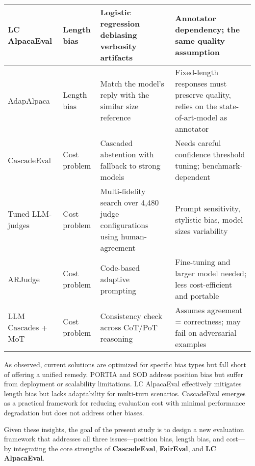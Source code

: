\documentclass[sigconf, authoryear]{acmart}
\begin{document}
\begin{table}[H]
{\begin{tabular}{|p{2.6cm}|p{1.6cm}|p{3.0cm}|p{4.2cm}|}
            \hline
            LC AlpacaEval      & Length bias                      & Logistic regression debiasing verbosity artifacts                           & Annotator dependency; the same quality assumption                                           \\
            \hline
            AdapAlpaca         & Length bias                      & Match the model's reply with the similar size reference                     & Fixed-length responses must preserve quality, relies on the state-of-art-model as annotator \\
            \hline
            CascadeEval        & Cost problem                     & Cascaded abstention with fallback to strong models                          & Needs careful confidence threshold tuning; benchmark-dependent                              \\
            \hline
            Tuned LLM-judges   & Cost problem                     & Multi-fidelity search over 4,480 judge configurations using human-agreement & Prompt sensitivity, stylistic bias, model sizes variability                                 \\
            \hline
            ARJudge            & Cost problem                     & Code-based adaptive prompting                                               & Fine-tuning and larger model needed; less cost-efficient and portable                       \\
            \hline
            LLM Cascades + MoT & Cost problem                     & Consistency check across CoT/PoT reasoning                                  & Assumes agreement = correctness; may fail on adversarial examples                           \\
            \hline
        \end{tabular}%
    }
\end{table}

As observed, current solutions are optimized for specific bias types but fall short of offering a unified remedy.
PORTIA and SOD address position bias but suffer from deployment or scalability limitations.
LC AlpacaEval effectively mitigates length bias but lacks adaptability for multi-turn scenarios.
CascadeEval emerges as a practical framework for reducing evaluation cost with minimal performance degradation but does not address other biases.

Given these insights, the goal of the present study is to design a new evaluation framework that addresses all three issues—position bias, length bias, and cost—by integrating the core strengths of \textbf{CascadeEval}, \textbf{FairEval}, and \textbf{LC AlpacaEval}.




\end{document}
